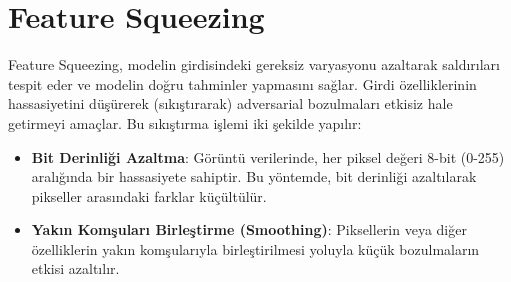 \section{Feature Squeezing}

Feature Squeezing, modelin girdisindeki gereksiz varyasyonu azaltarak saldırıları tespit eder ve modelin doğru tahminler yapmasını sağlar. Girdi özelliklerinin hassasiyetini düşürerek (sıkıştırarak) adversarial bozulmaları etkisiz hale getirmeyi amaçlar. Bu sıkıştırma işlemi iki şekilde yapılır:

\begin{itemize}
    \item \textbf{Bit Derinliği Azaltma}: Görüntü verilerinde, her piksel değeri 8-bit (0-255) aralığında bir hassasiyete sahiptir. Bu yöntemde, bit derinliği azaltılarak pikseller arasındaki farklar küçültülür.
    \item \textbf{Yakın Komşuları Birleştirme (Smoothing)}: Piksellerin veya diğer özelliklerin  yakın komşularıyla birleştirilmesi yoluyla küçük bozulmaların etkisi azaltılır.
\end{itemize}

\newpage